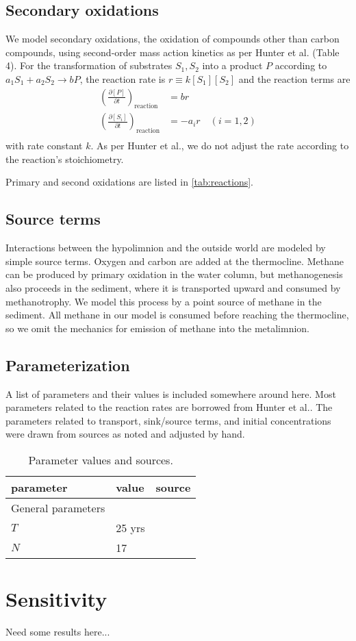 \documentclass{report}
\newcommand{\pd}[2]{ \frac{\partial #1}{\partial #2} }
\begin{document}
\subsection{Secondary oxidations}
We model secondary oxidations, the oxidation of compounds other than carbon compounds, using
second-order mass action kinetics as per Hunter et al.\cite{hunterkinetic1998} (Table 4). For the
transformation of substrates $S_1, S_2$ into a product $P$ according to $a_1 S_1 + a_2 S_2
\to b P$, the reaction rate is $r \equiv k [S_1] [S_2]$ and the reaction terms are
\begin{align}
  \left( \pd{[P]}{t} \right)_\text{reaction} &= b r \\
  \left( \pd{[S_i]}{t} \right)_\text{reaction} &= -a_i r \quad \left( i = 1, 2 \right) \\
\end{align}
with rate constant $k$. As per Hunter et al., we do not adjust the rate according to the reaction's stoichiometry.

Primary and second oxidations are listed in \ref{tab:reactions}.

\subsection{Source terms}
Interactions between the hypolimnion and the outside world are modeled by simple source terms. Oxygen and carbon are added at the thermocline. Methane can be produced by primary oxidation in the water column, but methanogenesis also proceeds in the sediment, where it is transported upward and consumed by methanotrophy. We model this process by a point source of methane in the sediment.
All methane in our model is consumed before reaching the thermocline, so we omit the mechanics for emission of methane into the metalimnion.

\subsection{Parameterization}
A list of parameters and their values is included somewhere around here. Most parameters
related to the reaction rates are borrowed from Hunter et al.\cite{hunterkinetic1998}. The
parameters related to transport, sink/source terms, and initial concentrations were drawn
from sources as noted and adjusted by hand. 

\begin{table}
\centering
\begin{tabular}{ l l l }
\toprule
parameter   &   value   & source \\
\midrule
General parameters \\
$T$     & 25 yrs  \\
$N$     & 17    \\
\bottomrule
\end{tabular}
\label{tab:parameters}
\caption{Parameter values and sources.}
\end{table}


\section{Sensitivity}
Need some results here...



\end{document}
